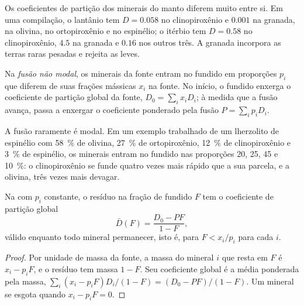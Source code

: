 Os coeficientes de partição dos minerais do manto diferem muito entre si.
Em uma compilação, o lantânio tem $D = 0.058$ no clinopiroxênio e $0.001$ na granada,
na olivina, no ortopiroxênio e no espinélio; o itérbio tem $D = 0.58$ no clinopiroxênio,
$4.5$ na granada e $0.16$ nos outros três.
A granada incorpora as terras raras pesadas e rejeita as leves.

\begin{definition}\label{def:b3:trace-element-modelling:nonmodal}
Na \emph{fusão não modal}, os minerais da fonte entram no fundido
em proporções $p_i$ que diferem de suas frações mássicas $x_i$ na fonte. No início,
o fundido enxerga o coeficiente de partição global da fonte, $D_0 = \sum_i x_iD_i$;
à medida que a fusão avança, passa a enxergar o coeficiente ponderado pela fusão
$P = \sum_i p_iD_i$.
\end{definition}

A fusão raramente é modal. Em um exemplo trabalhado de um lherzolito de espinélio
com \qty{58}{\percent} de olivina, \qty{27}{\percent} de ortopiroxênio,
\qty{12}{\percent} de clinopiroxênio e \qty{3}{\percent} de espinélio, os minerais entram no fundido
nas proporções 20, 25, 45 e \qty{10}{\percent}:
o clinopiroxênio se funde quatro vezes mais rápido que a sua parcela, e a olivina,
três vezes mais devagar.

\begin{proposition}
\label{prop:b3:trace-element-modelling:residue}
Na  com $p_i$ constante, o resíduo na fração de fundido $F$
tem o coeficiente de partição global
\[
\bar D(F) = \frac{D_0 - PF}{1 - F},
\]
válido enquanto todo mineral permanecer, isto é, para $F < x_i/p_i$ para cada $i$.
\end{proposition}

\begin{proof}
Por unidade de massa da fonte, a massa do mineral $i$ que resta em $F$ é $x_i - p_iF$,
e o resíduo tem massa $1 - F$. Seu coeficiente global é a média ponderada pela massa,
$\sum_i (x_i - p_iF)D_i/(1 - F) = (D_0 - PF)/(1 - F)$. Um mineral se esgota quando
$x_i - p_iF = 0$.
\end{proof}

